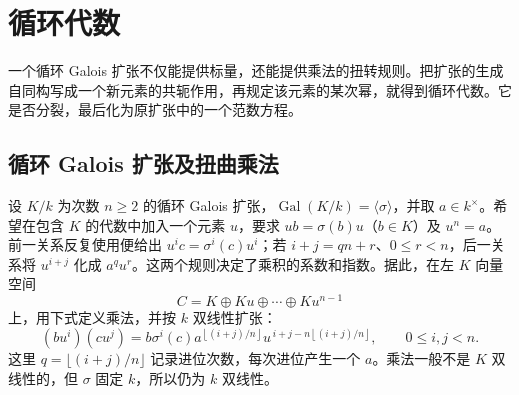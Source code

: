 
\section{循环代数}
\label{b2:sec:1802}

一个循环 Galois 扩张不仅能提供标量，还能提供乘法的扭转规则。把扩张的生成自同构写成一个新元素的共轭作用，再规定该元素的某次幂，就得到循环代数。它是否分裂，最后化为原扩张中的一个范数方程。

%
%

\subsection{循环 Galois 扩张及扭曲乘法}
\label{b2:subsec:1802:01}

设 \(K/k\) 为次数 \(n\ge2\) 的循环 Galois 扩张，\(\operatorname{Gal}(K/k)=\langle\sigma\rangle\)，并取 \(a\in k^\times\)。希望在包含 \(K\) 的代数中加入一个元素 \(u\)，要求 \(ub=\sigma(b)u\)（\(b\in K\)）及 \(u^n=a\)。前一关系反复使用便给出 \(u^ic=\sigma^i(c)u^i\)；若 \(i+j=qn+r\)、\(0\le r<n\)，后一关系将 \(u^{i+j}\) 化成 \(a^qu^r\)。这两个规则决定了乘积的系数和指数。据此，在左 \(K\) 向量空间
\[
	C=K\oplus Ku\oplus\cdots\oplus Ku^{n-1}
\]
上，用下式定义乘法，并按 \(k\) 双线性扩张：
\begin{equation}\label{b2:eq:cyclic-algebra-product}
	(bu^i)(cu^j)=b\sigma^i(c)a^{\left\lfloor(i+j)/n\right\rfloor}u^{\,i+j-n\left\lfloor(i+j)/n\right\rfloor}, \qquad 0\le i,j<n.
\end{equation}
这里 \(q=\lfloor(i+j)/n\rfloor\) 记录进位次数，每次进位产生一个 \(a\)。乘法一般不是 \(K\) 双线性的，但 \(\sigma\) 固定 \(k\)，所以仍为 \(k\) 双线性。


